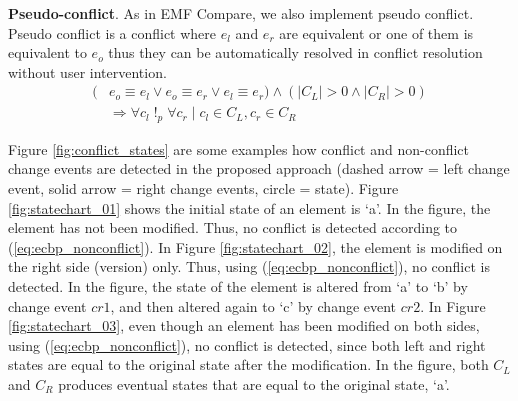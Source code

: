 \textbf{Pseudo-conflict}. As in EMF Compare, we also implement pseudo conflict. Pseudo conflict is a conflict where $e_{l}$ and $e_{r}$ are equivalent or one of them is equivalent to $e_{o}$ thus they can be automatically resolved in conflict resolution without user intervention.
\begin{equation} \label{eq:ecbp_pseudoconflict}
\begin{split}
(& e_{o} \equiv e_{l} \vee e_{o} \equiv e_{r} \vee e_{l} \equiv e_{r}) \wedge (|C_{L}| > 0 \wedge |C_{R}| > 0)\\
& \Rightarrow \forall c_{l} \;!_{p}\; \forall c_{r} \;|\; c_{l} \in C_{L}, c_{r} \in C_{R}
\end{split}
\end{equation} 

Figure \ref{fig:conflict_states} are some examples how conflict and non-conflict change events are detected in the proposed approach (dashed arrow = left change event, solid arrow = right change events, circle = state). Figure \ref{fig:statechart_01} shows the initial state of an element is `a'. In the figure, the element has not been modified. Thus, no conflict is detected according to (\ref{eq:ecbp_nonconflict}). In Figure \ref{fig:statechart_02}, the element is modified on the right side (version) only. Thus, using (\ref{eq:ecbp_nonconflict}), no conflict is detected. In the figure, the state of the element is altered from `a' to `b' by change event $cr1$, and then altered again to `c' by change event $cr2$. In Figure \ref{fig:statechart_03}, even though an element has been modified on both sides, using (\ref{eq:ecbp_nonconflict}), no conflict is detected, since both left and right states are equal to the original state after the modification. In the figure, both $C_{L}$ and $C_{R}$ produces eventual states that are equal to the original state, `a'. 

